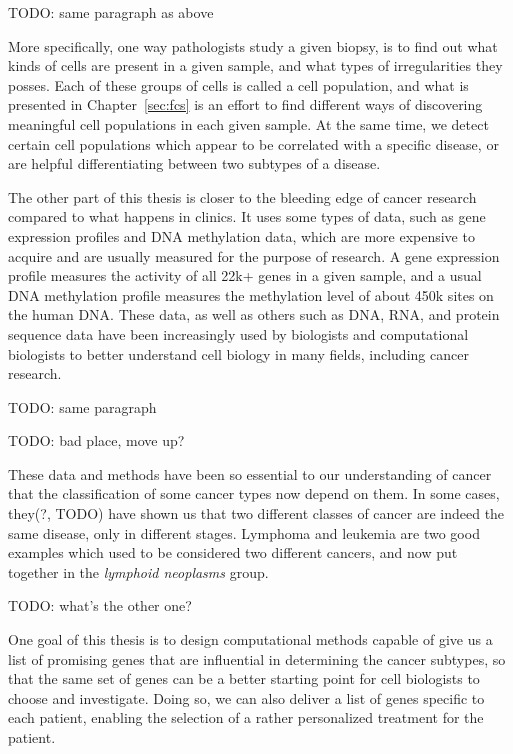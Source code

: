 TODO: same paragraph as above

More specifically, one way pathologists study a given biopsy, is to find out
what kinds of cells are present in a given sample, and what types of
irregularities they posses. Each of these groups of cells is called a cell
population, and what is presented in Chapter~\ref{sec:fcs} is an effort to find
different ways of discovering meaningful cell populations in each given sample.
At the same time, we detect certain cell populations which appear to be
correlated with a specific disease, or are helpful differentiating between
two subtypes of a disease.

The other part of this thesis is closer to the bleeding edge of cancer research
compared to what happens in clinics. It uses some types of data, such as gene
expression profiles and DNA methylation data, which are more expensive to
acquire and are usually measured for the purpose of research. A gene expression
profile measures the activity of all 22k+ genes in a given sample, and a usual
DNA methylation profile measures the methylation level of about 450k sites on
the human DNA. These data, as well as others such as DNA, RNA, and protein
sequence data have been increasingly used by biologists and computational
biologists to better understand cell biology in many fields, including cancer
research.

TODO: same paragraph

TODO: bad place, move up?

These data and methods have been so essential to our understanding of cancer
that the classification of some cancer types now depend on them. In some cases,
they(?, TODO) have shown us that two different classes of cancer are indeed the same
disease, only in different stages. Lymphoma and leukemia are two good examples
which used to be considered two different cancers, and now put together in the
\emph{lymphoid neoplasms} group.

TODO: what's the other one?

One goal of this thesis is to design computational methods capable of give us a
list of promising genes that are influential in determining the cancer subtypes,
so that the same set of genes can be a better starting point for cell biologists
to choose and investigate. Doing so, we can also deliver a list of genes
specific to each patient, enabling the selection of a rather personalized
treatment for the patient.

